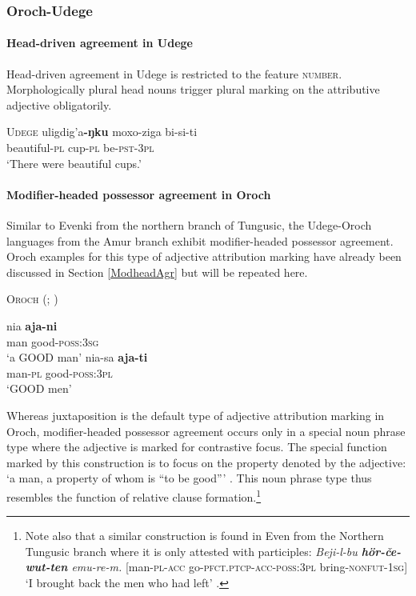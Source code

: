\subsubsection{Oroch-Udege}
\paragraph{Head-driven agreement in Udege}
Head-driven agreement in Udege is restricted to the feature \textsc{number}. Morphologically plural head nouns trigger plural marking on the attributive adjective obligatorily.
\begin{exe}
\ex \textsc{Udege} \citep[468]{nikolaeva-etal2001}
\gll	uligdig'a\textbf{-ŋku} moxo-ziga bi-si-ti\\
	beautiful\textsc{-pl} cup\textsc{-pl} be\textsc{-pst-3pl}\\
\glt	‘There were beautiful cups.’
\end{exe}

\paragraph{Modifier-headed possessor agreement in Oroch}
Similar to Evenki from the northern branch of Tungusic, the Udege-Oroch languages from the Amur branch exhibit modifier-headed possessor agreement. Oroch examples for this type of adjective attribution marking have already been discussed in Section \ref{ModheadAgr} but will be repeated here.
\begin{exe}
\ex \textsc{Oroch} (\citealt[207]{avrorin-etal1967}; \citealt[3]{malchukov2000}) \label{oroch modhead}
\begin{xlist}
\ex
\gll 	nia	\textbf{aja-ni}\\
	man good-\textsc{poss:3sg}\\
\glt	‘a GOOD man’
\ex
\gll nia-sa \textbf{aja-ti}\\	
	man-\textsc{pl} good-\textsc{poss:3pl}\\
\glt	‘GOOD men’
\end{xlist}
\end{exe}
Whereas juxtaposition is the default type of adjective attribution marking in Oroch, modifier-headed possessor agreement occurs only in a special noun phrase type where the adjective is marked for contrastive focus. The special function marked by this construction is to focus on the property denoted by the adjective: ‘a man, a property of whom is “to be good”’ \citep[3]{malchukov2000}. This noun phrase type thus resembles the function of relative clause formation.\footnote{Note also that a similar construction is found in Even from the Northern Tungusic branch where it is only attested with participles: \textit{Beji-l-bu \textbf{hör-če-wut-ten} emu-re-m.} [man-\textsc{pl}-\textsc{acc} go-\textsc{pfct.ptcp}-\textsc{acc}-\textsc{poss:3pl} bring-\textsc{nonfut}-\textsc{1sg}] ‘I brought back the men who had left’ \citep[31]{malchukov1995}.}

